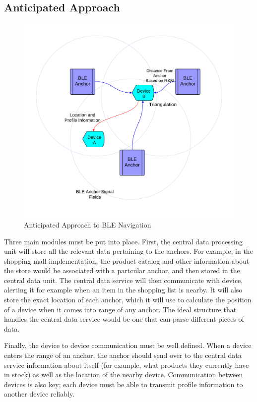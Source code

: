 \documentclass{sig-alternate}
\begin{document}
\subsection{Anticipated Approach}
\label{subsec:approach}
\begin{figure}[htb!]
	\begin{center}
		\includegraphics[width=1.00\linewidth]{blockflow}
	\end{center}
	\vspace{-12pt}
	\caption{Anticipated Approach to BLE Navigation}
	\label{fig:Block Flow Diagram}
\end{figure}

Three main modules must be put into place. First, the central
data processing unit will store all the relevant data pertaining to
the anchors. For example, in the shopping mall implementation, 
the product catalog and other information about 
the store would be associated with a partcular anchor, and then 
stored in the central data unit. The central data service will then
communicate with device, alerting it for example when an item
in the shopping list is nearby. It will also store the exact location
of each anchor, which it will use to calculate the position of a 
device when it comes into range of any anchor. The ideal 
structure that handles the central data service would be one that
can parse different pieces of data. 

Finally, the device to device communication must be well defined.
When a device enters the range of an anchor, the anchor should 
send over to the central data service information about itself (for
example, what products they currently have in stock) as well as the
location of the nearby device. Communication between devices
is also key; each device must be able to transmit profile information
to another device reliably.
\end{document}
